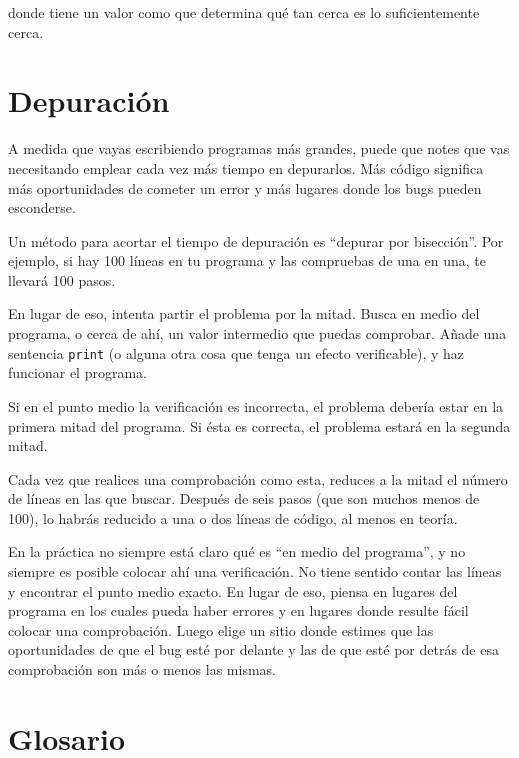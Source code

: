 %
donde  tiene un valor como  que
determina qué tan cerca es lo suficientemente cerca.






\hypertarget{depuraciuxf3n}{%
\section{Depuración}\label{depuraciuxf3n}}


A medida que vayas escribiendo programas más grandes, puede que notes
que vas necesitando emplear cada vez más tiempo en depurarlos. Más
código significa más oportunidades de cometer un error y más lugares
donde los bugs pueden esconderse.

 

Un método para acortar el tiempo de depuración es ``depurar por
bisección''. Por ejemplo, si hay 100 líneas en tu programa y las
compruebas de una en una, te llevará 100 pasos.

En lugar de eso, intenta partir el problema por la mitad. Busca en medio
del programa, o cerca de ahí, un valor intermedio que puedas comprobar.
Añade una sentencia \texttt{print} (o alguna otra cosa que tenga un
efecto verificable), y haz funcionar el programa.

Si en el punto medio la verificación es incorrecta, el problema debería
estar en la primera mitad del programa. Si ésta es correcta, el problema
estará en la segunda mitad.

Cada vez que realices una comprobación como esta, reduces a la mitad el
número de líneas en las que buscar. Después de seis pasos (que son
muchos menos de 100), lo habrás reducido a una o dos líneas de código,
al menos en teoría.

En la práctica no siempre está claro qué es ``en medio del programa'', y
no siempre es posible colocar ahí una verificación. No tiene sentido
contar las líneas y encontrar el punto medio exacto. En lugar de eso,
piensa en lugares del programa en los cuales pueda haber errores y en
lugares donde resulte fácil colocar una comprobación. Luego elige un
sitio donde estimes que las oportunidades de que el bug esté por delante
y las de que esté por detrás de esa comprobación son más o menos las
mismas.

\hypertarget{glosario}{%
\section{Glosario}\label{glosario}}

